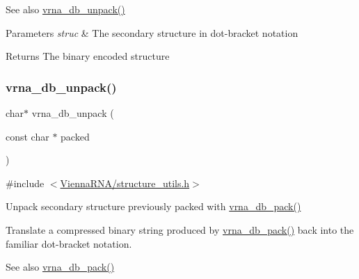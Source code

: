 \begin{DoxySeeAlso}{See also}
\hyperlink{group__struct__utils_ga6490adff857d84ce06e6f379ae3a4512}{vrna\+\_\+db\+\_\+unpack()} 
\end{DoxySeeAlso}

\begin{DoxyParams}{Parameters}
{\em struc} & The secondary structure in dot-\/bracket notation \\
\hline
\end{DoxyParams}
\begin{DoxyReturn}{Returns}
The binary encoded structure 
\end{DoxyReturn}
\mbox{\label{group__struct__utils_ga6490adff857d84ce06e6f379ae3a4512}} 
\subsubsection{\texorpdfstring{vrna\+\_\+db\+\_\+unpack()}{vrna\_db\_unpack()}}
{\footnotesize\ttfamily char$\ast$ vrna\+\_\+db\+\_\+unpack (\begin{DoxyParamCaption}\item[{const char $\ast$}]{packed }\end{DoxyParamCaption})}



{\ttfamily \#include $<$\hyperlink{structure__utils_8h}{Vienna\+R\+N\+A/structure\+\_\+utils.\+h}$>$}



Unpack secondary structure previously packed with \hyperlink{group__struct__utils_ga55c4783060a1464f862f858d5599c9e1}{vrna\+\_\+db\+\_\+pack()} 

Translate a compressed binary string produced by \hyperlink{group__struct__utils_ga55c4783060a1464f862f858d5599c9e1}{vrna\+\_\+db\+\_\+pack()} back into the familiar dot-\/bracket notation.

\begin{DoxySeeAlso}{See also}
\hyperlink{group__struct__utils_ga55c4783060a1464f862f858d5599c9e1}{vrna\+\_\+db\+\_\+pack()} 
\end{DoxySeeAlso}

